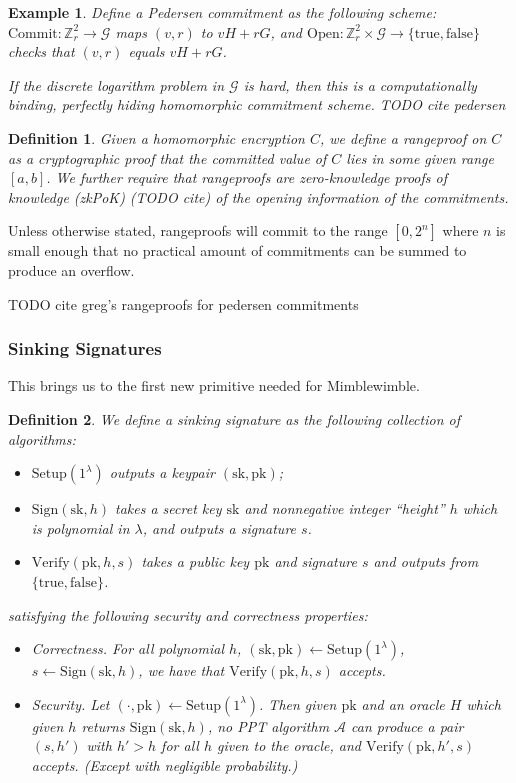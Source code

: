 \documentclass[letterpaper]{article}
\newtheorem{defn}{Definition}
\newtheorem{expl}{Example}
\newcommand{\Setup}{\mathrm{Setup}}
\newcommand{\Sign}{\mathrm{Sign}}
\newcommand{\Verify}{\mathrm{Verify}}
\newcommand{\Commit}{\mathrm{Commit}}
\newcommand{\Open}{\mathrm{Open}}
\newcommand{\sk}{\mathrm{sk}}
\newcommand{\pk}{\mathrm{pk}}
\newcommand{\truth}{\{\mathrm{true}, \mathrm{false}\}}
\begin{document}
\begin{expl} Define a \emph{Pedersen commitment} as the following scheme:
$\Commit:\mathbb{Z}_r^2\to\mathcal{G}$ maps $(v, r)$ to $vH + rG$, and
$\Open:\mathbb{Z}_r^2\times\mathcal{G}\to\truth$ checks that $(v, r)$
equals $vH + rG$.

If the discrete logarithm problem in  $\mathcal{G}$ is hard, then this
is a computationally binding, perfectly hiding homomorphic commitment
scheme. TODO cite pedersen
\end{expl}

\begin{defn} Given a homomorphic encryption $C$, we define a
\emph{rangeproof} on $C$ as a cryptographic proof that the committed
value of $C$ lies in some given range $[a, b]$. We further require
that rangeproofs are zero-knowledge proofs of knowledge (zkPoK) (TODO cite) of
the opening information of the commitments.
\end{defn}
Unless otherwise stated, rangeproofs will commit to the range
$[0,2^n]$ where $n$ is small enough that no practical amount
of commitments can be summed to produce an overflow.

TODO cite greg's rangeproofs for pedersen commitments

\subsubsection{Sinking Signatures}

This brings us to the first new primitive needed for Mimblewimble.

\begin{defn} We define a \emph{sinking signature} as the following
collection of algorithms:
\begin{itemize}
\item $\Setup(1^\lambda)$ outputs a keypair $(\sk, \pk)$;
\item $\Sign(\sk, h)$ takes a secret key $\sk$ and nonnegative integer
``height'' $h$ which is polynomial in $\lambda$, and outputs a signature $s$.
\item $\Verify(\pk, h, s)$ takes a public key $\pk$ and signature $s$ and
outputs from $\truth$.
\end{itemize}
satisfying the following security and correctness properties:
\begin{itemize}
\item Correctness. For all polynomial $h$, $(\sk, \pk)\gets\Setup(1^\lambda)$,
$s\gets\Sign(\sk, h)$, we have that $\Verify(\pk, h, s)$ accepts.
\item Security. Let $(\cdot, \pk)\gets\Setup(1^\lambda)$. Then given $\pk$ and
an oracle $H$ which given $h$ returns $\Sign(\sk, h)$, no PPT algorithm
$\mathcal{A}$ can produce a pair $(s, h')$ with $h'>h$ for all $h$ given to
the oracle, and $\Verify(\pk, h', s)$ accepts.
(Except with negligible probability.)
\end{itemize}\label{sinkingsig}
\end{defn}
\end{document}
